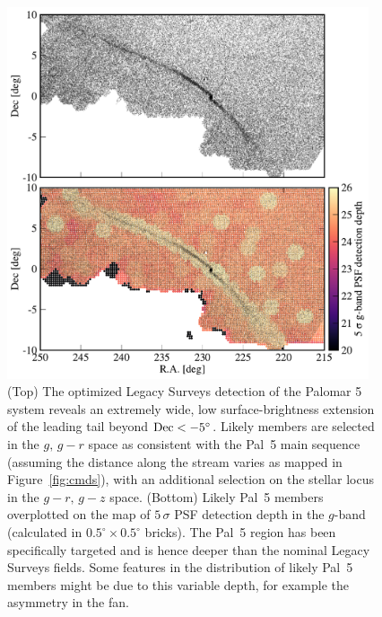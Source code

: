 \documentclass[modern]{aastex62}
\begin{document}
\begin{figure}
\begin{center}
\includegraphics[width=0.95\textwidth]{fig2_maps.pdf}
\end{center}
\caption{
(Top) The optimized Legacy Surveys detection of the Palomar 5 system reveals an extremely wide, low surface-brightness extension of the leading tail beyond $\rm Dec<-5^\circ$.
Likely members are selected in the $g,\,g-r$ space as consistent with the Pal~5 main sequence (assuming the distance along the stream varies as mapped in Figure~\ref{fig:cmds}), with an additional selection on the stellar locus in the $g-r,\,g-z$ space.
(Bottom) Likely Pal~5 members overplotted on the map of $5\,\sigma$ PSF detection depth in the $g$-band (calculated in $0.5^\circ\times0.5^\circ$ bricks).
The Pal~5 region has been specifically targeted and is hence deeper than the nominal Legacy Surveys fields.
Some features in the distribution of likely Pal~5 members might be due to this variable depth, for example the asymmetry in the fan.
}
\label{fig:maps}
\end{figure}
\end{document}
